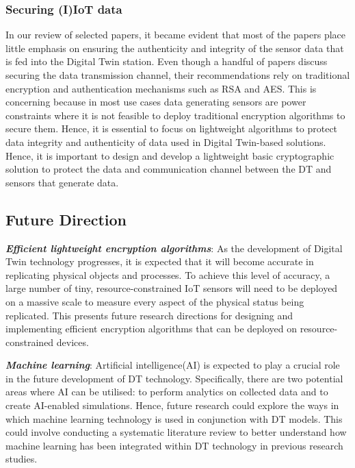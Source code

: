 \subsubsection{Securing (I)IoT data}
In our review of selected papers, it became evident that most of the papers place little emphasis on ensuring the authenticity and integrity of the sensor data that is fed into the Digital Twin station. Even though a handful of papers discuss securing the data transmission channel, their recommendations rely on traditional encryption and authentication mechanisms such as RSA and AES. This is concerning because in most use cases data generating sensors are power constraints where it is not feasible to deploy traditional encryption algorithms to secure them. Hence, it is essential to focus on lightweight algorithms to protect data integrity and authenticity of data used in Digital Twin-based solutions. Hence, it is important to design and develop a lightweight basic cryptographic solution to protect the data and communication channel between the DT and sensors that generate data.  




\subsection{Future Direction}

\textbf{\textit{Efficient lightweight encryption algorithms}}: As the development of Digital Twin technology progresses, it is expected that it will become accurate in replicating physical objects and processes. To achieve this level of accuracy, a large number of tiny, resource-constrained IoT sensors will need to be deployed on a massive scale to measure every aspect of the physical status being replicated. This presents future research directions for designing and implementing efficient encryption algorithms that can be deployed on resource-constrained devices.


\textbf{\textit{Machine learning}}: Artificial intelligence(AI) is expected to play a crucial role in the future development of DT technology. Specifically, there are two potential areas where AI can be utilised: to perform analytics on collected data and to create AI-enabled simulations. Hence, future research could explore the ways in which machine learning technology is used in conjunction with DT models. This could involve conducting a systematic literature review to better understand how machine learning has been integrated within DT technology in previous research studies.

